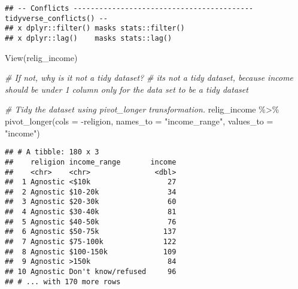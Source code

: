 \documentclass[
]{article}
\newenvironment{Shaded}{\begin{snugshade}}{\end{snugshade}}
\newcommand{\AttributeTok}[1]{\textcolor[rgb]{0.77,0.63,0.00}{#1}}
\newcommand{\CommentTok}[1]{\textcolor[rgb]{0.56,0.35,0.01}{\textit{#1}}}
\newcommand{\FunctionTok}[1]{\textcolor[rgb]{0.00,0.00,0.00}{#1}}
\newcommand{\NormalTok}[1]{#1}
\newcommand{\SpecialCharTok}[1]{\textcolor[rgb]{0.00,0.00,0.00}{#1}}
\newcommand{\StringTok}[1]{\textcolor[rgb]{0.31,0.60,0.02}{#1}}
\begin{document}
\begin{verbatim}
## -- Conflicts ------------------------------------------ tidyverse_conflicts() --
## x dplyr::filter() masks stats::filter()
## x dplyr::lag()    masks stats::lag()
\end{verbatim}

\begin{Shaded}
\begin{Highlighting}[]
\FunctionTok{View}\NormalTok{(relig\_income)}

\CommentTok{\# If not, why is it not a tidy dataset?}
\CommentTok{\#\textquotesingle{} it\textquotesingle{}s not a tidy dataset, because income should be under 1 column only for the data set to be a tidy dataset}

\CommentTok{\# Tidy the dataset using pivot\_longer transformation.}
\NormalTok{relig\_income }\SpecialCharTok{\%\textgreater{}\%}
\FunctionTok{pivot\_longer}\NormalTok{(}\AttributeTok{cols =} \SpecialCharTok{{-}}\NormalTok{religion,}
             \AttributeTok{names\_to =} \StringTok{"income\_range"}\NormalTok{,}
             \AttributeTok{values\_to =} \StringTok{"income"}\NormalTok{)}
\end{Highlighting}
\end{Shaded}

\begin{verbatim}
## # A tibble: 180 x 3
##    religion income_range       income
##    <chr>    <chr>               <dbl>
##  1 Agnostic <$10k                  27
##  2 Agnostic $10-20k                34
##  3 Agnostic $20-30k                60
##  4 Agnostic $30-40k                81
##  5 Agnostic $40-50k                76
##  6 Agnostic $50-75k               137
##  7 Agnostic $75-100k              122
##  8 Agnostic $100-150k             109
##  9 Agnostic >150k                  84
## 10 Agnostic Don't know/refused     96
## # ... with 170 more rows
\end{verbatim}
\end{document}
